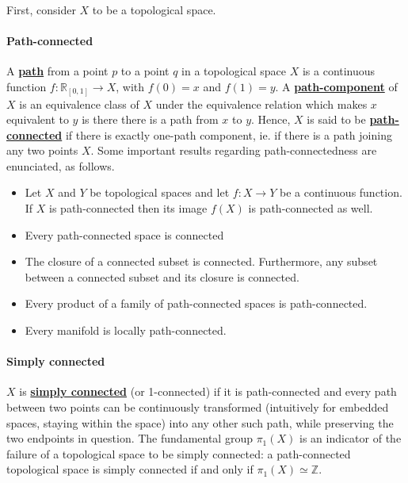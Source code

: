 
First, consider $X$ to be a topological space.\\

\paragraph{\textbf{Path-connected}}

A \textbf{\underline{path}} from a point $p$ to a point $q$ in a topological space $X$ is a continuous function $f: \mathds{R}_{[0,1]} \to X$, with $f(0) = x$ and $f(1) = y$. A \textbf{\underline{path-component}} of $X$ is an equivalence class of $X$ under the equivalence relation which makes $x$ equivalent to $y$ is there there is a path from $x$ to $y$. Hence, $X$ is said to be \textbf{\underline{path-connected}} if there is exactly one-path component, ie. if there is a path joining any two points $X$. Some important results regarding path-connectedness are enunciated, as follows.

\begin{itemize}
    \item Let $X$ and $Y$ be topological spaces and let $f: X \to Y$ be a continuous function. If $X$ is path-connected then its image $f(X)$ is path-connected as well. 
    \item Every path-connected space is connected
    \item The closure of a connected subset is connected. Furthermore, any subset between a connected subset and its closure is connected. 
    \item Every product of a family of path-connected  spaces is path-connected.
    \item Every manifold is locally path-connected. \\
\end{itemize}

\paragraph{\textbf{Simply connected}}

$X$ is \textbf{\underline{simply connected}} (or 1-connected) if it is path-connected and every path between two points can be continuously transformed (intuitively for embedded spaces, staying within the space) into any other such path, while preserving the two endpoints in question. The fundamental group $\pi_1(X)$ is an indicator of the failure of a topological space to be simply connected: a path-connected topological space is simply connected if and only if $\pi_1(X) \simeq \mathds{Z}$. \\

